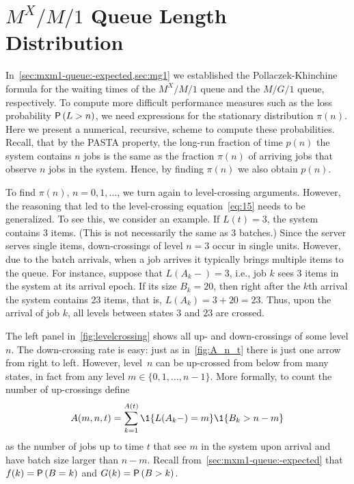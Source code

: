 \documentclass[companion]{subfiles}
\begin{document}
\section{$M^X/M/1$ Queue Length Distribution}
\label{sec:batch-arrivals}


In~\cref{sec:mxm1-queue:-expected,sec:mg1} we established the Pollaczek-Khinchine formula for the waiting times of the $M^X/M/1$ queue and the $M/G/1$ queue, respectively.
To compute more difficult performance measures such as the loss probability $\P{L>n}$, we need expressions for the stationary distribution $\pi(n)$. 
Here we present a numerical, recursive, scheme to compute these probabilities. Recall, that by the PASTA property, the long-run fraction of time $p(n)$ the  system contains $n$ jobs is the same as the fraction  $\pi(n)$ of arriving jobs that observe $n$ jobs in the system.  Hence, by finding $\pi(n)$ we also obtain $p(n)$. 




To find $\pi(n)$, $n=0, 1, \ldots$, we turn again to level-crossing arguments.
However, the reasoning that led to the level-crossing equation~\cref{eq:15} needs to be generalized.
To see this, we consider an example.
If $L(t)=3$, the system contains $3$ items.
(This is not necessarily the same as 3 batches.)
Since the server serves single items, down-crossings of level $n=3$ occur in single units.
However, due to the batch arrivals, when a job arrives it typically brings multiple items to the queue.
For instance, suppose that $L(A_k-) = 3$, i.e., job $k$ sees 3 items in the system at its arrival epoch.
If its size $B_k = 20$, then right after the $k$th arrival the system contains 23 items, that is, $L(A_k)=3+20=23$.
Thus, upon the arrival of job $k$, all levels between states $3$ and $23$ are crossed.

The left panel in~\cref{fig:levelcrossing} shows all up- and down-crossings of some level $n$.
The down-crossing rate is easy: just as in~\cref{fig:A_n_t} there is just one arrow from right to left.
However, level~$n$ can be up-crossed from below from many states, in fact from any level $m \in \{0, 1, \ldots, n-1\}$. 
More formally, to count the number of up-crossings define
\begin{equation*}
 A(m,n,t) = \sum_{k=1}^{A(t)}\1{L(A_k-) = m}\1{B_k > n-m}
\end{equation*}
as the number of jobs up to time $t$ that see $m$ in the system upon arrival and have batch size larger than $n-m$. Recall from~\cref{sec:mxm1-queue:-expected} that $f(k)=\P{B=k}$ and $G(k) = \P{B>k}$.
\end{document}
